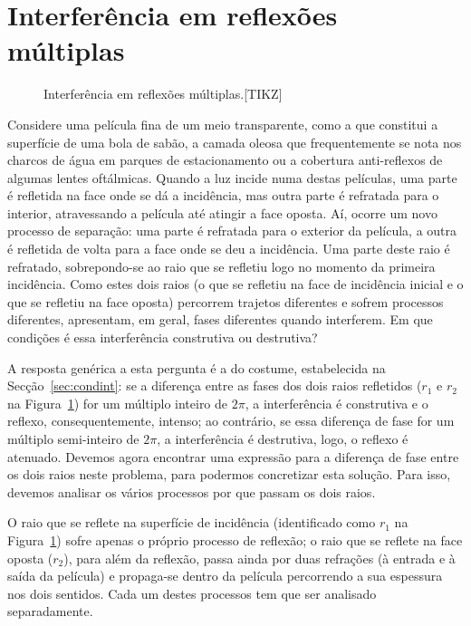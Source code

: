 \section{Interferência em reflexões múltiplas}
\begin{figure}
    {\centering
        
        \caption{Interferência em reflexões múltiplas.[TIKZ]\label{fig:40-050}}

    }
\end{figure}
Considere uma película fina de um meio transparente, como a que constitui a
superfície de uma bola de sabão, a camada oleosa que frequentemente se nota nos
charcos de água em parques de estacionamento ou a cobertura anti-reflexos de
algumas lentes oftálmicas. Quando a luz incide numa destas películas, uma parte
é refletida na face onde se dá a incidência, mas outra parte é refratada para o
interior, atravessando a película até atingir a face oposta. Aí, ocorre um novo
processo de separação: uma parte é refratada para o exterior da película, a
outra é refletida de volta para a face onde se deu a incidência. Uma parte deste
raio é refratado, sobrepondo-se ao raio que se refletiu logo no momento da
primeira incidência. Como estes dois raios (o que se refletiu na face de
incidência inicial e o que se refletiu na face oposta) percorrem trajetos
diferentes e sofrem processos diferentes, apresentam, em geral, fases diferentes
quando interferem. Em que condições é essa interferência construtiva ou
destrutiva?

A resposta genérica a esta pergunta é a do costume, estabelecida na
Secção~\ref{sec:condint}: se a diferença entre as fases dos dois raios
refletidos ($r_1$ e $r_2$ na Figura~\ref{fig:40-050}) for um múltiplo inteiro de
$2\pi$, a interferência é construtiva e o reflexo, consequentemente, intenso; ao
contrário, se essa diferença de fase for um múltiplo semi-inteiro de $2\pi$, a
interferência é destrutiva, logo, o reflexo é atenuado. Devemos agora encontrar
uma expressão para a diferença de fase entre os dois raios neste problema, para
podermos concretizar esta solução. Para isso, devemos analisar os vários
processos por que passam os dois raios.

O raio que se reflete na superfície de incidência (identificado como $r_1$ na
Figura~\ref{fig:40-050}) sofre apenas o próprio processo de reflexão; o raio que
se reflete na face oposta ($r_2$), para além da reflexão, passa ainda por duas
refrações (à entrada e à saída da película) e propaga-se dentro da película
percorrendo a sua espessura nos dois sentidos. Cada um destes processos tem que
ser analisado separadamente.

